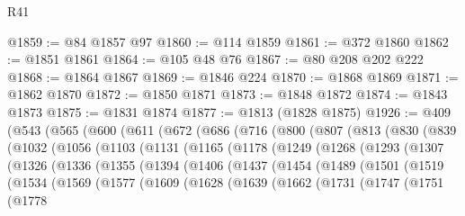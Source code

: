 \begin{lexlean}{R41}
\begin{coremodule}
{{{{{{{{{{{{{{{{{{{{{{{{{{{{{{{{{{{{{{{{{{{{{{{{{{{{{{{{{{{{{{{{{{{{{{{{{{{{{{{{{{{{{{{@1859 := @84 @1857 @97
@1860 := @114 @1859
@1861 := @372 @1860
@1862 := @1851 @1861
@1864 := @105 @48 @76
@1867 := @80 @208 @202 @222
@1868 := @1864 @1867
@1869 := @1846 @224
@1870 := @1868 @1869
@1871 := @1862 @1870
@1872 := @1850 @1871
@1873 := @1848 @1872
@1874 := @1843 @1873
@1875 := @1831 @1874
@1877 := @1813 (@1828 @1875)
@1926 := @409
    (@543
      (@565
        (@600
          (@611
            (@672
              (@686
                (@716
                  (@800
                    (@807
                      (@813
                        (@830
                          (@839
                            (@1032
                              (@1056
                                (@1103
                                  (@1131
                                    (@1165
                                      (@1178
                                        (@1249
                                          (@1268
                                            (@1293
                                              (@1307
                                                (@1326
                                                  (@1336
                                                    (@1355
                                                      (@1394
                                                        (@1406
                                                          (@1437
                                                            (@1454
                                                              (@1489
                                                                (@1501
                                                                  (@1519
                                                                    (@1534
                                                                      (@1569
                                                                        (@1577
                                                                          (@1609
                                                                            (@1628
                                                                              (@1639
                                                                                (@1662
                                                                                  (@1731
                                                                                    (@1747
                                                                                      (@1751
                                                                                        (@1778
}}}}}}}}}}}}}}}}}}}}}}}}}}}}}}}}}}}}}}}}}}}}}}}}}}}}}}}}}}}}}}}}}}}}}}}}}}}}}}}}}}}}}}}
\end{coremodule}
\end{lexlean}
